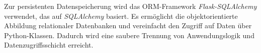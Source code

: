 Zur persistenten Datenspeicherung wird das ORM-Framework \textit{Flask-SQLAlchemy} verwendet, das auf \textit{SQLAlchemy} basiert.
Es ermöglicht die objektorientierte Abbildung relationaler Datenbanken und vereinfacht den Zugriff auf Daten über Python-Klassen.
Dadurch wird eine saubere Trennung von Anwendungslogik und Datenzugriffsschicht erreicht.